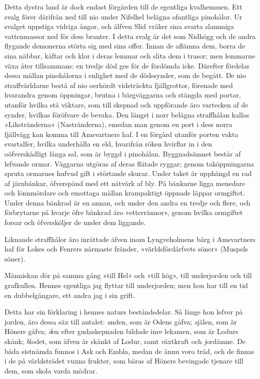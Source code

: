 Detta dystra land är dock endast förgården till de egentliga kvalhemmen.
Ett svalg förer därifrån ned till nio under Nifelhel belägna ofantliga
pinohålor. Ur svalget uppstiga vidriga ångor, och älfven Slid vräker
sina svarta slammiga vattenmassor ned för dess branter. I detta svalg är
det som Nidhögg och de andra flygande demonerna störta sig med sina
offer. Innan de aflämna dem, borra de sina näbbar, käftar och klor i
deras lemmar och slita dem i trasor; men lemmarne växa åter tillsammans:
en tredje död ges för de fördömda icke. Därefter fördelas dessa mällan
pinohålorna i enlighet med de dödssynder, som de begått. De nio
straffvärldarne bestå af nio oerhördt vidsträckta fjällgrottor, förenade
med hvarandra genom öppningar, brutna i bärgväggarna och stängda med
portar, utanför hvilka stå väktare, som till skepnad och uppförande äro
vartecken af de synder, hvilkas föröfvare de bevaka. Den längst i norr
belägna straffhålan kallas »Likstränderna» (Nastränderna), emedan man
genom en port i dess norra fjällvägg kan komma till Amsvartners haf. I
en förgård utanför porten vakta svartalfer, hvilka underhålla en eld,
hvarifrån röken hvirflar in i den oöfverskådligt långa sal, som är byggd
i pinohålan. Byggnadsämnet består af lefvande ormar. Väggarna utgöras af
deras flätade ryggar; genom taköppningarna spruta ormarnes hufvud gift i
störtande skurar. Under taket är upphängd en rad af järnbänkar,
öfverspänd med ett nätvärk af bly. På bänkarne ligga menedare och
lönnmördare och emottaga mällan krampaktigt öppnade läppar ormgiftet.
Under denna bänkrad är en annan, och under den andra en tredje och
flere, och förbrytarne på hvarje öfre bänkrad äro »etterrännor», genom
hvilka ormgiftet forsar och öfversköljer de under dem liggande.

Liknande straffhålor äro inrättade äfven inom Lyngveholmens bärg i
Amsvartners haf för Lokes och Fenrers närmaste fränder,
»världsfördärfvets söner» (Muspels söner).





Människan dör på samma gång »till Hel» och »till hög», till underjorden
och till grafkullen. Hennes egentliga jag flyttar till underjorden; men
hon har till en tid en dubbelgångare, ett andra jag i sin grift.

Detta har sin förklaring i hennes naturs beståndsdelar. Så länge hon
lefver på jorden, äro dessa säx till antalet: {\emph anden}, som är Odens
gåfva; {\emph själen}, som är Höners gåfva; {\emph den efter gudaskepnaden
bildade inre lekamen}, som är Lodurs skänk; {\emph blodet}, som äfven är
skänkt af Lodur, samt {\emph växtkraft} och {\emph jordämne.} De båda
sistnämda funnos i Ask och Embla, medan de ännu voro träd, och de finnas
i de på världsträdet vuxna frukter, som bäras af Höners bevingade
tjenare till dem, som skola varda mödrar.

